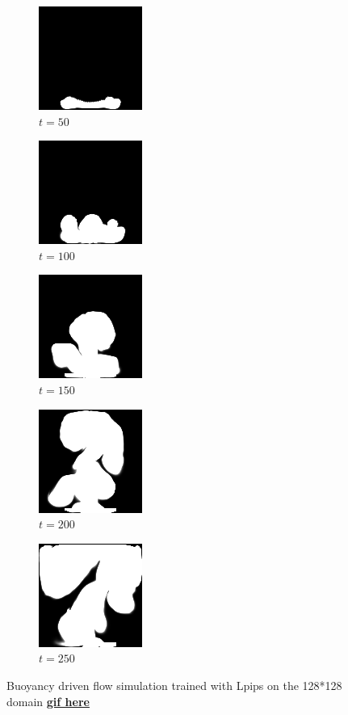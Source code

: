 \documentclass[a4paper,12pt,twoside]{report}
\begin{document}
\begin{figure}
	\centering
	\begin{subfigure}{0.18\textwidth}
		\centering
		\includegraphics[scale=0.56]{buoyancy_test/dens_000050_lpips.png}
		\caption{$t=50$}
	\end{subfigure}
	\begin{subfigure}{0.18\textwidth}
		\centering
		\includegraphics[scale=0.56]{buoyancy_test/dens_000100_lpips.png}
		\caption{$t=100$}
	\end{subfigure}
	\begin{subfigure}{0.18\textwidth}
		\centering
		\includegraphics[scale=0.56]{buoyancy_test/dens_000150_lpips.png}
		\caption{$t=150$}
	\end{subfigure}
	\begin{subfigure}{0.18\textwidth}
		\centering
		\includegraphics[scale=0.56]{buoyancy_test/dens_000200_lpips.png}
		\caption{$t=200$}
	\end{subfigure}
	\begin{subfigure}{0.18\textwidth}
		\centering
		\includegraphics[scale=0.56]{buoyancy_test/dens_000249_lpips.png}
		\caption{$t=250$}
	\end{subfigure}
	\caption{Buoyancy driven flow simulation trained with Lpips on the 128*128 domain \href{https://github.com/w191444052/sol-data/blob/master/buoyancy_high/lpips.gif}{\bf{gif here}}}
	\label{sol buoyancy high lpips}
\end{figure}
\end{document}
